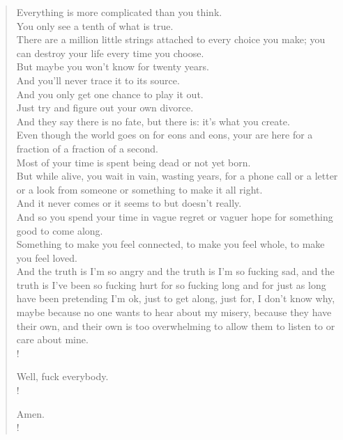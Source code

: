 \documentclass[../butidigress.tex]{subfiles}
\begin{document}
\newpage

\setlength{\versewidth}{46ex}
\begin{verse}
Everything is more complicated than you think. \\
You only see a tenth of what is true. \\
There are a million little strings attached to every choice you make; you can destroy your life every time you choose. \\
But maybe you won't know for twenty years. \\
And you'll never trace it to its source. \\
And you only get one chance to play it out. \\
Just try and figure out your own divorce. \\
And they say there is no fate, but there is: it's what you create. \\
Even though the world goes on for eons and eons, your are here for a fraction of a fraction of a second. \\
Most of your time is spent being dead or not yet born. \\
But while alive, you wait in vain, wasting years, for a phone call or a letter or a look from someone or something to make it all right. \\
And it never comes or it seems to but doesn't really. \\
And so you spend your time in vague regret or vaguer hope for something good to come along. \\
Something to make you feel connected, to make you feel whole, to make you feel loved. \\
And the truth is I'm so angry and the truth is I'm so fucking sad, and the truth is I've been so fucking hurt for so fucking long and for just as long have been pretending I'm ok, just to get along, just for, I don't know why, maybe because no one wants to hear about my misery, because they have their own, and their own is too overwhelming to allow them to listen to or care about mine. \\!

Well, fuck everybody. \\!

Amen.\\!
\end{verse}

\newpage
\end{document}
